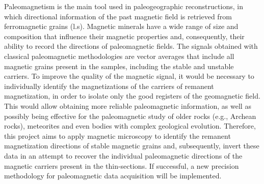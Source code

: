\begin{singlespace}
Paleomagnetism is the main tool used in paleogeographic reconstructions, in which directional information of the past magnetic field is retrieved from ferromagnetic grains (l.s). Magnetic minerals have a wide range of size and composition that influence their magnetic properties and, consequently, their ability to record the directions of paleomagnetic fields. The signals obtained with classical paleomagnetic methodologies are vector averages that include all magnetic grains present in the samples, including the stable and unstable carriers. To improve the quality of the magnetic signal, it would be necessary to individually identify the magnetizations of the carriers of remanent magnetization, in order to isolate only the good registers of the geomagnetic field. This would allow obtaining more reliable paleomagnetic information, as well as possibly being effective for the paleomagnetic study of older rocks (e.g., Archean rocks), meteorites and even bodies with complex geological evolution. Therefore, this project aims to apply magnetic microscopy to identify the remanent magnetization directions of stable magnetic grains and, subsequently, invert these data in an attempt to recover the individual paleomagnetic directions of the magnetic carriers present in the thin-sections. If successful, a new precision methodology for paleomagnetic data acquisition will be implemented.

\end{singlespace}